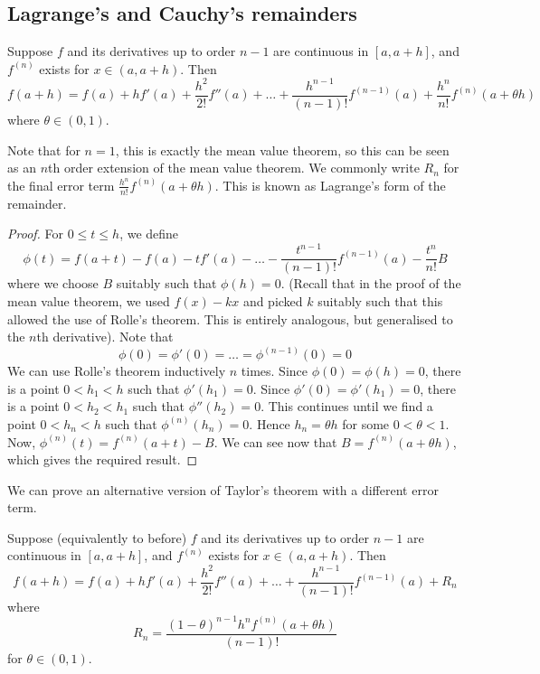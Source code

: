 \subsection{Lagrange's and Cauchy's remainders}
\begin{theorem}
	Suppose \(f\) and its derivatives up to order \(n-1\) are continuous in \([a, a+h]\), and \(f^{(n)}\) exists for \(x \in (a, a+h)\).
	Then
	\[
		f(a+h) = f(a) + hf'(a) + \frac{h^2}{2!} f''(a) + \dots + \frac{h^{n-1}}{(n-1)!}f^{(n-1)}(a) + \frac{h^n}{n!}f^{(n)}(a + \theta h)
	\]
	where \(\theta \in (0, 1)\).
\end{theorem}
\noindent Note that for \(n=1\), this is exactly the mean value theorem, so this can be seen as an \(n\)th order extension of the mean value theorem.
We commonly write \(R_n\) for the final error term \(\frac{h^n}{n!}f^{(n)}(a + \theta h)\).
This is known as Lagrange's form of the remainder.
\begin{proof}
	For \(0 \leq t \leq h\), we define
	\[
		\phi(t) = f(a+t) - f(a) - tf'(a) - \dots - \frac{t^{n-1}}{(n-1)!}f^{(n-1)}(a) - \frac{t^n}{n!}B
	\]
	where we choose \(B\) suitably such that \(\phi(h) = 0\).
	(Recall that in the proof of the mean value theorem, we used \(f(x) - kx\) and picked \(k\) suitably such that this allowed the use of Rolle's theorem.
	This is entirely analogous, but generalised to the \(n\)th derivative).
	Note that
	\[
		\phi(0) = \phi'(0) = \dots = \phi^{(n-1)}(0) = 0
	\]
	We can use Rolle's theorem inductively \(n\) times.
	Since \(\phi(0) = \phi(h) = 0\), there is a point \(0 < h_1 < h\) such that \(\phi'(h_1) = 0\).
	Since \(\phi'(0) = \phi'(h_1) = 0\), there is a point \(0 < h_2 < h_1\) such that \(\phi''(h_2) = 0\).
	This continues until we find a point \(0 < h_n < h\) such that \(\phi^{(n)}(h_n) = 0\).
	Hence \(h_n = \theta h\) for some \(0 < \theta < 1\).
	Now, \(\phi^{(n)}(t) = f^{(n)}(a + t) - B\).
	We can see now that \(B = f^{(n)}(a + \theta h)\), which gives the required result.
\end{proof}
\noindent We can prove an alternative version of Taylor's theorem with a different error term.
\begin{theorem}
	Suppose (equivalently to before) \(f\) and its derivatives up to order \(n-1\) are continuous in \([a, a+h]\), and \(f^{(n)}\) exists for \(x \in (a, a+h)\).
	Then
	\[
		f(a+h) = f(a) + hf'(a) + \frac{h^2}{2!} f''(a) + \dots + \frac{h^{n-1}}{(n-1)!}f^{(n-1)}(a) + R_n
	\]
	where
	\[
		R_n = \frac{(1 - \theta)^{n-1}h^n f^{(n)}(a + \theta h)}{(n-1)!}
	\]
	for \(\theta \in (0, 1)\).
\end{theorem}
